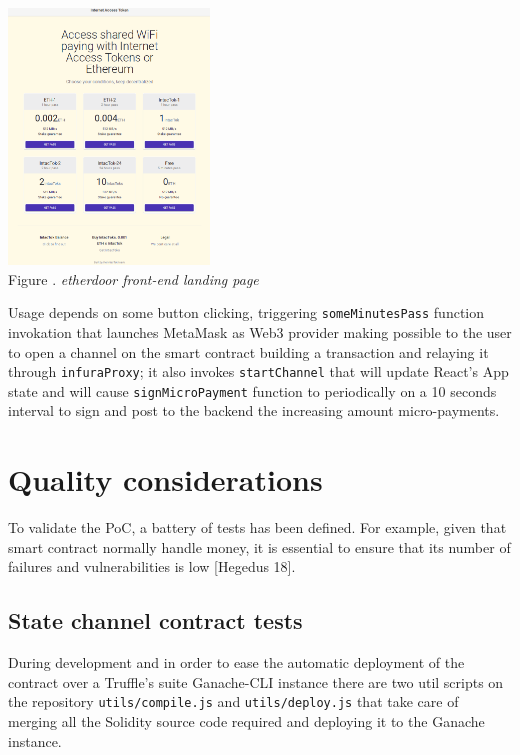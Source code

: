 \documentclass[12pt]{amsart}
\begin{document}
\begin{multicols}{2}
\begin{center}
  \includegraphics[keepaspectratio, width=0.4\textwidth]{images/portal-y.eps}
  \\
  Figure . \textit{etherdoor front-end landing page}
\end{center}

Usage depends on some button clicking, triggering
\texttt{someMinutesPass} function invokation that launches MetaMask
as Web3 provider making possible to the user to open a channel
on the smart contract building a transaction and relaying it
through \texttt{infuraProxy}; it also invokes \texttt{startChannel}
that will update React's App state and will cause
\texttt{signMicroPayment} function to periodically on a 10 seconds
interval to sign and post to the backend the increasing amount
micro-payments.

\section{Quality considerations}\label{sec:proofs}

\vspace{0.35cm}

To validate the PoC, a battery of tests has
been defined. For example, given
that smart contract normally handle money,
it is essential to ensure that
its number of failures and vulnerabilities is low [Hegedus 18].

\subsection{State channel contract tests}

\vspace{0.35cm}

During development and in order to ease
the automatic deployment of the contract
over a Truffle's suite Ganache-CLI\cite{ganache}
instance there are two util scripts on the
repository\cite{state-channel-contract-a}
\texttt{utils/compile.js} and \texttt{utils/deploy.js}
that take care of merging all the Solidity source
code required and deploying it to the Ganache instance.


\end{multicols}
\end{document}
